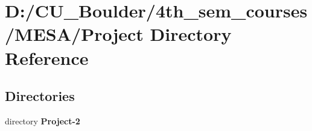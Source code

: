 \section{D\+:/\+C\+U\+\_\+\+Boulder/4th\+\_\+sem\+\_\+courses/\+M\+E\+S\+A/\+Project Directory Reference}
\label{dir_d7f3e6eff71365e8c40336a9a49fdf13}
\subsection*{Directories}
\begin{DoxyCompactItemize}
\item 
directory \textbf{ Project-\/2}
\end{DoxyCompactItemize}

